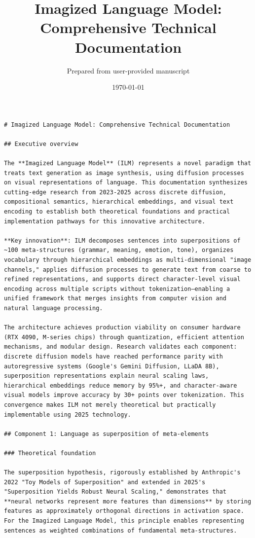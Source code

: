 \documentclass[11pt]{article}
\title{Imagized Language Model: Comprehensive Technical Documentation}
\author{Prepared from user-provided manuscript}
\date{\today}
\begin{document}
\maketitle

\small
\begin{verbatim}
# Imagized Language Model: Comprehensive Technical Documentation

## Executive overview

The **Imagized Language Model** (ILM) represents a novel paradigm that treats text generation as image synthesis, using diffusion processes on visual representations of language. This documentation synthesizes cutting-edge research from 2023-2025 across discrete diffusion, compositional semantics, hierarchical embeddings, and visual text encoding to establish both theoretical foundations and practical implementation pathways for this innovative architecture.

**Key innovation**: ILM decomposes sentences into superpositions of ~100 meta-structures (grammar, meaning, emotion, tone), organizes vocabulary through hierarchical embeddings as multi-dimensional "image channels," applies diffusion processes to generate text from coarse to refined representations, and supports direct character-level visual encoding across multiple scripts without tokenization—enabling a unified framework that merges insights from computer vision and natural language processing.

The architecture achieves production viability on consumer hardware (RTX 4090, M-series chips) through quantization, efficient attention mechanisms, and modular design. Research validates each component: discrete diffusion models have reached performance parity with autoregressive systems (Google's Gemini Diffusion, LLaDA 8B), superposition representations explain neural scaling laws, hierarchical embeddings reduce memory by 95%+, and character-aware visual models improve accuracy by 30+ points over tokenization. This convergence makes ILM not merely theoretical but practically implementable using 2025 technology.

## Component 1: Language as superposition of meta-elements

### Theoretical foundation

The superposition hypothesis, rigorously established by Anthropic's 2022 "Toy Models of Superposition" and extended in 2025's "Superposition Yields Robust Neural Scaling," demonstrates that **neural networks represent more features than dimensions** by storing features as approximately orthogonal directions in activation space. For the Imagized Language Model, this principle enables representing sentences as weighted combinations of fundamental meta-structures.


\end{verbatim}
\end{document}
